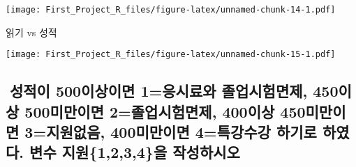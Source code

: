 \documentclass[
]{article}
\newenvironment{Shaded}{\begin{snugshade}}{\end{snugshade}}
\newcommand{\DataTypeTok}[1]{\textcolor[rgb]{0.13,0.29,0.53}{#1}}
\newcommand{\DecValTok}[1]{\textcolor[rgb]{0.00,0.00,0.81}{#1}}
\newcommand{\KeywordTok}[1]{\textcolor[rgb]{0.13,0.29,0.53}{\textbf{#1}}}
\newcommand{\NormalTok}[1]{#1}
\newcommand{\OperatorTok}[1]{\textcolor[rgb]{0.81,0.36,0.00}{\textbf{#1}}}
\newcommand{\StringTok}[1]{\textcolor[rgb]{0.31,0.60,0.02}{#1}}
\begin{document}
\texttt{[image: First\_Project\_R\_files/figure-latex/unnamed-chunk-14-1.pdf]}

읽기 vs 성적

\begin{Shaded}
\end{Shaded}

\texttt{[image: First\_Project\_R\_files/figure-latex/unnamed-chunk-15-1.pdf]}

\hypertarget{uxc131uxc801uxc774-500uxc774uxc0c1uxc774uxba74-1uxc751uxc2dcuxb8ccuxc640-uxc878uxc5c5uxc2dcuxd5d8uxba74uxc81c-450uxc774uxc0c1-500uxbbf8uxb9ccuxc774uxba74-2uxc878uxc5c5uxc2dcuxd5d8uxba74uxc81c-400uxc774uxc0c1-450uxbbf8uxb9ccuxc774uxba74-3uxc9c0uxc6d0uxc5c6uxc74c-400uxbbf8uxb9ccuxc774uxba74-4uxd2b9uxac15uxc218uxac15-uxd558uxae30uxb85c-uxd558uxc600uxb2e4.-uxbcc0uxc218-uxc9c0uxc6d01234uxc744-uxc791uxc131uxd558uxc2dcuxc624}{%
\subsection{성적이 500이상이면 1=응시료와 졸업시험면제, 450이상
500미만이면 2=졸업시험면제, 400이상 450미만이면 3=지원없음, 400미만이면
4=특강수강 하기로 하였다. 변수 지원\{1,2,3,4\}을
작성하시오}\label{uxc131uxc801uxc774-500uxc774uxc0c1uxc774uxba74-1uxc751uxc2dcuxb8ccuxc640-uxc878uxc5c5uxc2dcuxd5d8uxba74uxc81c-450uxc774uxc0c1-500uxbbf8uxb9ccuxc774uxba74-2uxc878uxc5c5uxc2dcuxd5d8uxba74uxc81c-400uxc774uxc0c1-450uxbbf8uxb9ccuxc774uxba74-3uxc9c0uxc6d0uxc5c6uxc74c-400uxbbf8uxb9ccuxc774uxba74-4uxd2b9uxac15uxc218uxac15-uxd558uxae30uxb85c-uxd558uxc600uxb2e4.-uxbcc0uxc218-uxc9c0uxc6d01234uxc744-uxc791uxc131uxd558uxc2dcuxc624}}

\begin{Shaded}
\end{Shaded}
\end{document}
